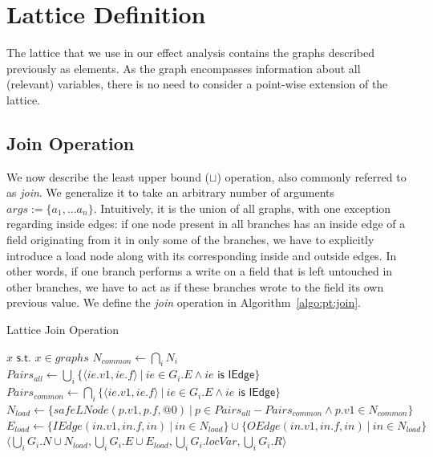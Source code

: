 \section{Lattice Definition}
\label{sec:pt:lattice}
The lattice that we use in our effect analysis contains the graphs described
previously as elements. As the graph encompasses information about all
(relevant) variables, there is no need to consider a point-wise extension of the
lattice.

\subsection{Join Operation}
We now describe the least upper bound ($\sqcup$) operation, also commonly
referred to as \emph{join}. We generalize it to take an arbitrary number of
arguments $args := \{ a_1, ... a_n \}$. Intuitively, it is the union of all
graphs, with one exception regarding inside edges: if one node present in all
branches has an inside edge of a field originating from it in only some of the
branches, we have to explicitly introduce a load node along with its
corresponding inside and outside edges. In other words, if one branch performs
a write on a field that is left untouched in other branches, we have to act as if these branches wrote to the field its own previous value. We define the
\emph{join} operation in Algorithm~\ref{algo:pt:join}.
\begin{algorithm}
\caption{Lattice Join Operation}\label{algo:pt:join}
\begin{algorithmic}[1]
        \State \Return $x \textsf{ s.t. } x \in graphs$
    \Else
        \State $N_{common} \gets \bigcap_i N_i$
        \State $Pairs_{all} \gets  \bigcup_i \{ \langle ie.v1, ie.f \rangle ~|~ ie \in G_i.E \land ie \textsf { is IEdge}\}$
        \State $Pairs_{common} \gets  \bigcap_i \{ \langle ie.v1, ie.f \rangle ~|~ ie \in G_i.E \land ie \textsf { is IEdge}\}$
        \State $N_{load} \gets \{ safeLNode(p.v1, p.f, @0) ~|~ p \in Pairs_{all} - Pairs_{common} \land p.v1 \in N_{common} \}$
        \State $E_{load} \gets \{ IEdge(in.v1, in.f, in) ~|~ in \in N_{load} \} \cup \{ OEdge(in.v1, in.f, in) ~|~ in \in N_{load} \}$
        \State \Return $\langle \bigcup_i G_i.N \cup N_{load}, \bigcup_i G_i.E \cup E_{load}, \bigcup_i G_i.locVar , \bigcup_i G_i.R \rangle$
    \EndIf
\EndFunction
\end{algorithmic}
\end{algorithm}


